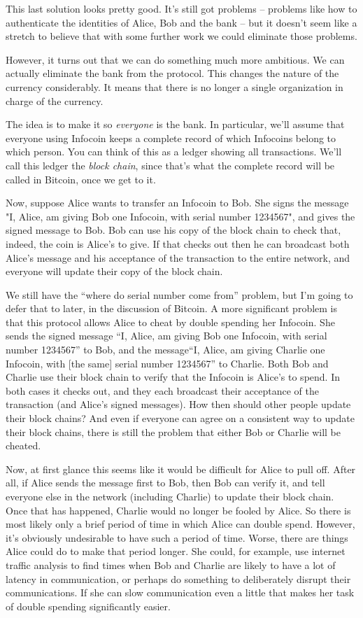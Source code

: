\documentclass[12pt]{book}
\newcounter{problem}[chapter]
\newcounter{example}[chapter]
\begin{document}
This last solution looks pretty good.  It's still got problems --
problems like how to authenticate the identities of Alice, Bob and the
bank -- but it doesn't seem like a stretch to believe that with some
further work we could eliminate those problems.

However, it turns out that we can do something much more ambitious.
We can actually eliminate the bank from the protocol.  This changes
the nature of the currency considerably.  It means that there is no
longer a single organization in charge of the currency.

The idea is to make it so \emph{everyone} is the bank.  In particular,
we'll assume that everyone using Infocoin keeps a complete record of
which Infocoins belong to which person.  You can think of this as a
ledger showing all transactions.  We'll call this ledger the
\emph{block chain}, since that's what the complete record will be
called in Bitcoin, once we get to it.

Now, suppose Alice wants to transfer an Infocoin to Bob.  She signs
the message "I, Alice, am giving Bob one Infocoin, with serial number
1234567", and gives the signed message to Bob.  Bob can use his copy
of the block chain to check that, indeed, the coin is Alice's to give.
If that checks out then he can broadcast both Alice's message and his
acceptance of the transaction to the entire network, and everyone will
update their copy of the block chain.

We still have the ``where do serial number come from'' problem, but
I'm going to defer that to later, in the discussion of Bitcoin.  A
more significant problem is that this protocol allows Alice to cheat
by double spending her Infocoin.  She sends the signed message ``I,
Alice, am giving Bob one Infocoin, with serial number 1234567'' to
Bob, and the message``I, Alice, am giving Charlie one Infocoin, with
[the same] serial number 1234567'' to Charlie.  Both Bob and Charlie
use their block chain to verify that the Infocoin is Alice's to spend.
In both cases it checks out, and they each broadcast their acceptance
of the transaction (and Alice's signed messages).  How then should
other people update their block chains?  And even if everyone can
agree on a consistent way to update their block chains, there is still
the problem that either Bob or Charlie will be cheated.

Now, at first glance this seems like it would be difficult for Alice
to pull off.  After all, if Alice sends the message first to Bob, then
Bob can verify it, and tell everyone else in the network (including
Charlie) to update their block chain.  Once that has happened, Charlie
would no longer be fooled by Alice. So there is most likely only a
brief period of time in which Alice can double spend.  However, it's
obviously undesirable to have such a period of time.  Worse, there are
things Alice could do to make that period longer.  She could, for
example, use internet traffic analysis to find times when Bob and
Charlie are likely to have a lot of latency in communication, or
perhaps do something to deliberately disrupt their communications.  If
she can slow communication even a little that makes her task of double
spending significantly easier.
\end{document}
